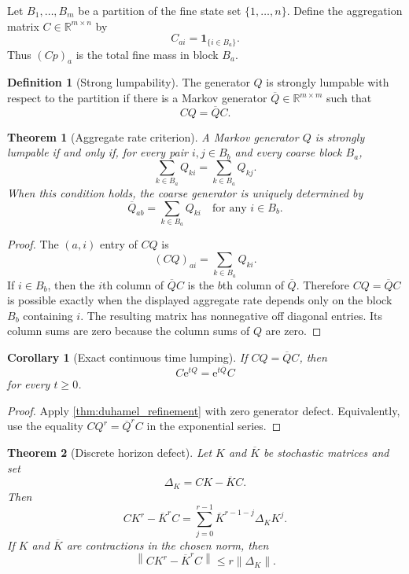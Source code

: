 \documentclass{aomart}
\newtheorem{theorem}{Theorem}[section]
\newtheorem{corollary}[corollary]{Corollary}
\theoremstyle{definition}
\newtheorem{definition}[definition]{Definition}
\theoremstyle{remark}
\newcommand{\RR}{\mathbb R}
\newcommand{\one}{\mathbf 1}
\newcommand{\e}{\mathrm e}
\newcommand{\norm}[1]{\left\lVert#1\right\rVert}
\begin{document}
Let \(B_1,\ldots,B_m\) be a partition of the fine state set \(\{1,\ldots,n\}\). Define the aggregation matrix \(C\in\RR^{m\times n}\) by
\[
C_{ai}=\one_{\{i\in B_a\}}.
\]
Thus \((Cp)_a\) is the total fine mass in block \(B_a\).

\begin{definition}[Strong lumpability]\label{def:strong_lumpability}
The generator \(Q\) is strongly lumpable with respect to the partition if there is a Markov generator \(\overline Q\in\RR^{m\times m}\) such that
\[
CQ=\overline QC.
\]
\end{definition}

\begin{theorem}[Aggregate rate criterion]\label{thm:aggregate_rate_criterion}
A Markov generator \(Q\) is strongly lumpable if and only if, for every pair \(i,j\in B_b\) and every coarse block \(B_a\),
\[
\boxed{
\sum_{k\in B_a}Q_{ki}
=
\sum_{k\in B_a}Q_{kj}.
}
\]
When this condition holds, the coarse generator is uniquely determined by
\[
\overline Q_{ab}
=
\sum_{k\in B_a}Q_{ki}
\quad\text{for any }i\in B_b.
\]
\end{theorem}

\begin{proof}
The \((a,i)\) entry of \(CQ\) is
\[
(CQ)_{ai}=\sum_{k\in B_a}Q_{ki}.
\]
If \(i\in B_b\), then the \(i\)th column of \(\overline QC\) is the \(b\)th column of \(\overline Q\). Therefore \(CQ=\overline QC\) is possible exactly when the displayed aggregate rate depends only on the block \(B_b\) containing \(i\). The resulting matrix has nonnegative off diagonal entries. Its column sums are zero because the column sums of \(Q\) are zero.
\end{proof}

\begin{corollary}[Exact continuous time lumping]\label{cor:exact_continuous_lumping}
If \(CQ=\overline QC\), then
\[
\boxed{
C\e^{tQ}=\e^{t\overline Q}C
}
\]
for every \(t\geq0\).
\end{corollary}

\begin{proof}
Apply \cref{thm:duhamel_refinement} with zero generator defect. Equivalently, use the equality \(CQ^r=\overline Q^rC\) in the exponential series.
\end{proof}

\begin{theorem}[Discrete horizon defect]\label{thm:discrete_lumping_defect}
Let \(K\) and \(\overline K\) be stochastic matrices and set
\[
\Delta_K=CK-\overline KC.
\]
Then
\[
\boxed{
CK^r-\overline K^rC
=
\sum_{j=0}^{r-1}
\overline K^{r-1-j}\Delta_KK^j.
}
\]
If \(K\) and \(\overline K\) are contractions in the chosen norm, then
\[
\norm{CK^r-\overline K^rC}
\leq r\norm{\Delta_K}.
\]
\end{theorem}
\end{document}
